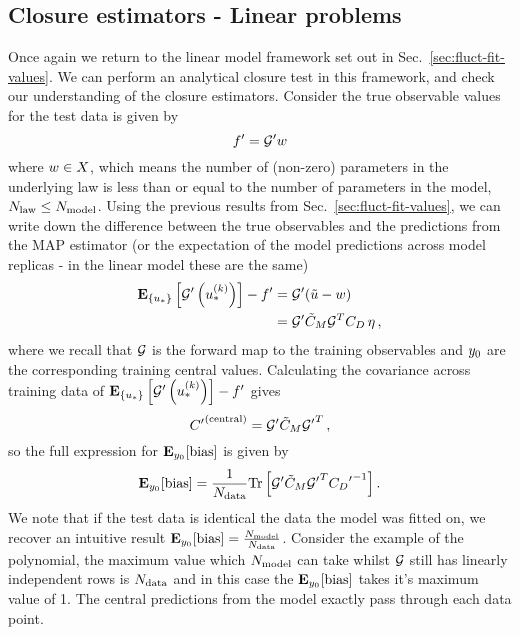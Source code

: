 
\subsection{Closure estimators - Linear problems}
\label{Sec:LinearMapEstimators}

Once again we return to the linear model framework set out in
Sec.~\ref{sec:fluct-fit-values}. We can perform an analytical closure
test in this framework, and check our
understanding of the closure estimators. Consider the true observable
values for the test data is given by
\begin{equation}\label{eq:LinearLawMap}
    {{f}^{\prime}} = {{\mathcal{G}}^{\prime}} w
\end{equation}
where $w \in X$, which means the number of (non-zero) parameters
in the underlying law is less than or equal to the number of parameters in the
model, $N_{\rm law} \leq N_{\rm model}$. Using the previous results from
Sec.~\ref{sec:fluct-fit-values}, we can write down the
difference between the true observables and the predictions from the MAP estimator
(or the expectation of the model predictions across model replicas - in the
linear model these are the same)
\begin{equation}
    \begin{split}
        \mathbf{E}_{\{ u_* \}} \left[ {{\mathcal{G}}^{\prime}}\left(u_*^{(k)}\right) \right] - {{f}^{\prime}} &=
        {{\mathcal{G}}^{\prime}} (\tilde{u} - w ) \\
        &= {{\mathcal{G}}^{\prime}} \tilde{C}_M \mathcal{G}^T C_{D} \, \eta \, ,
    \end{split}
\end{equation}
where we recall that $\mathcal{G}$ is the forward map to the training observables
and $y_0$ are
the corresponding training central values. Calculating the covariance across
training data of
$\mathbf{E}_{\{ u_* \}} \left[ {{\mathcal{G}}^{\prime}}\left(u_*^{(k)}\right) \right] - {{f}^{\prime}}$
gives
\begin{equation}
    {{C}^{\prime}}^{(\rm central)} = {{\mathcal{G}}^{\prime}} \tilde{C}_M {{\mathcal{G}}^{\prime}}^T \, ,
\end{equation}
so the full expression for $\mathbf{E}_{y_0}[{\rm bias}]$ is given by
\begin{equation}\label{eq:BiasLinearModel}
    \mathbf{E}_{y_0}[{\rm bias}] = \frac{1}{N_{\rm data}}
    {\rm Tr} \left[
        {{\mathcal{G}}^{\prime}} \tilde{C}_M {{\mathcal{G}}^{\prime}}^T
        {{C_{D}}^{\prime}}^{-1}
    \right].
\end{equation}
We note that if the test data is identical the data the model was fitted on,
we recover an intuitive result $\mathbf{E}_{y_0}[{\rm bias}] = \frac{N_{\rm model}}{N_{\rm data}}$.
Consider the example of the polynomial, the maximum value which $N_{\rm model}$ can
take whilst $\mathcal{G}$ still has linearly independent rows is $N_{\rm data}$ and in this case
the $\mathbf{E}_{y_0}[{\rm bias}]$ takes it's maximum value of 1. The central
predictions from the model exactly pass through each data point.

